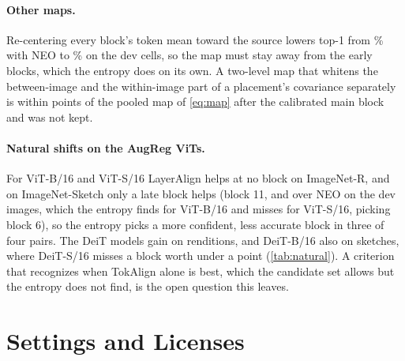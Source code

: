 \documentclass{article}
\newcommand{\tok}{TokAlign}
\newcommand{\layer}{LayerAlign}
\newcommand{\neo}{NEO}
\begin{document}
\paragraph{Other maps.} Re-centering every block's token mean toward the source lowers top-1 from \% with \neo{} to \% on the dev cells, so the map must stay away from the early blocks, which the entropy does on its own. A two-level map that whitens the between-image and the within-image part of a placement's covariance separately is within  points of the pooled map of \cref{eq:map} after the calibrated main block and was not kept.

\paragraph{Natural shifts on the AugReg ViTs.} For ViT-B/16 and ViT-S/16 \layer{} helps at no block on ImageNet-R, and on ImageNet-Sketch only a late block helps (block 11,  and  over \neo{} on the dev images, which the entropy finds for ViT-B/16 and misses for ViT-S/16, picking block 6), so the entropy picks a more confident, less accurate block in three of four pairs. The DeiT models gain on renditions, and DeiT-B/16 also on sketches, where DeiT-S/16 misses a block worth under a point (\cref{tab:natural}). A criterion that recognizes when \tok{} alone is best, which the candidate set allows but the entropy does not find, is the open question this leaves.

\section{Settings and Licenses}
\label{app:settings}
\end{document}
